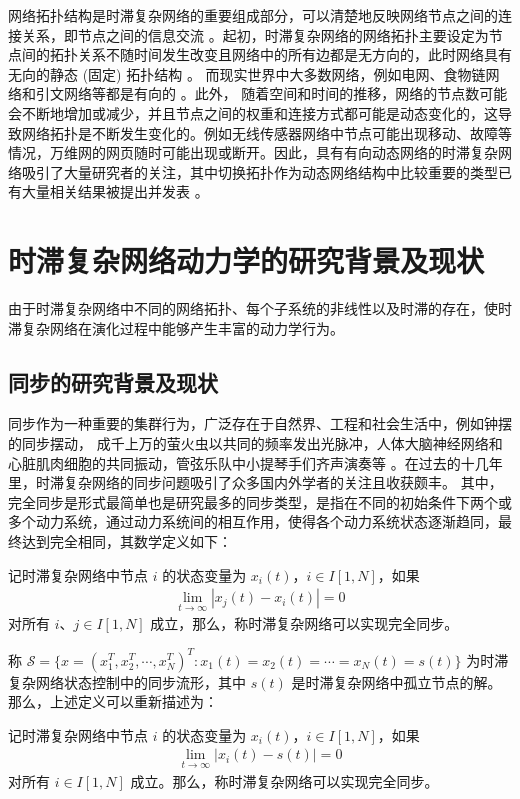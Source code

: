  网络拓扑结构是时滞复杂网络的重要组成部分，可以清楚地反映网络节点之间的连接关系，即节点之间的信息交流 \cite{wang2002complex885}。起初，时滞复杂网络的网络拓扑主要设定为节点间的拓扑关系不随时间发生改变且网络中的所有边都是无方向的，此时网络具有无向的静态 (固定) 拓扑结构 \cite{cheng2013mean261}。 而现实世界中大多数网络，例如电网、食物链网络和引文网络等都是有向的 \cite{camacho2002robust, yu2009second881,gu2019pidDOI}。此外，
随着空间和时间的推移，网络的节点数可能会不断地增加或减少，并且节点之间的权重和连接方式都可能是动态变化的，这导致网络拓扑是不断发生变化的。例如无线传感器网络中节点可能出现移动、故障等情况，万维网的网页随时可能出现或断开。因此，具有有向动态网络的时滞复杂网络吸引了大量研究者的关注，其中切换拓扑作为动态网络结构中比较重要的类型已有大量相关结果被提出并发表 \cite{wang2011synchronization3070,jin2015function730,chen2016synchronizing189,li2017state6377}。
\section{时滞复杂网络动力学的研究背景及现状}
由于时滞复杂网络中不同的网络拓扑、每个子系统的非线性以及时滞的存在，使时滞复杂网络在演化过程中能够产生丰富的动力学行为。 
\subsection{同步的研究背景及现状} 
同步作为一种重要的集群行为，广泛存在于自然界、工程和社会生活中，例如钟摆的同步摆动，
成千上万的萤火虫以共同的频率发出光脉冲，人体大脑神经网络和心脏肌肉细胞的共同振动，管弦乐队中小提琴手们齐声演奏等 \cite{mirollo1990synchronization1645,fries2001modulation1560,steinmetz2000attention187}。在过去的十几年里，时滞复杂网络的同步问题吸引了众多国内外学者的关注且收获颇丰。
其中，
完全同步是形式最简单也是研究最多的同步类型，是指在不同的初始条件下两个或多个动力系统，通过动力系统间的相互作用，使得各个动力系统状态逐渐趋同，最终达到完全相同，其数学定义如下：
\begin{definition}  \cite{2018dynamicstimedelays}  记时滞复杂网络中节点 $i$ 的状态变量为 $x_i(t)$，$i\in I[1,N]$，如果 
\begin{align*}
\lim_{t\rightarrow \infty}|x_j(t)-x_i(t)|=0 
\end{align*}
对所有 $i$、$j\in I[1,N]$ 成立，那么，称时滞复杂网络可以实现完全同步。
\end{definition}  

 称 $\mathcal{S}=\{x=(x^T_1,x^T_2,\cdots,x^T_N)^T:x_1(t)=x_2(t)=\cdots=x_N(t)=s(t)\}$ 为时滞复杂网络状态控制中的同步流形，其中 $s(t)$ 是时滞复杂网络中孤立节点的解。那么，上述定义可以重新描述为： 
\begin{definition}   记时滞复杂网络中节点 $i$ 的状态变量为 $x_i(t)$，$i\in I[1,N]$，如果 
    \begin{align*}
    \lim_{t\rightarrow \infty}|x_i(t)-s(t)|=0 
    \end{align*}
    对所有 $i \in I[1,N]$ 成立。那么，称时滞复杂网络可以实现完全同步。
\end{definition}

